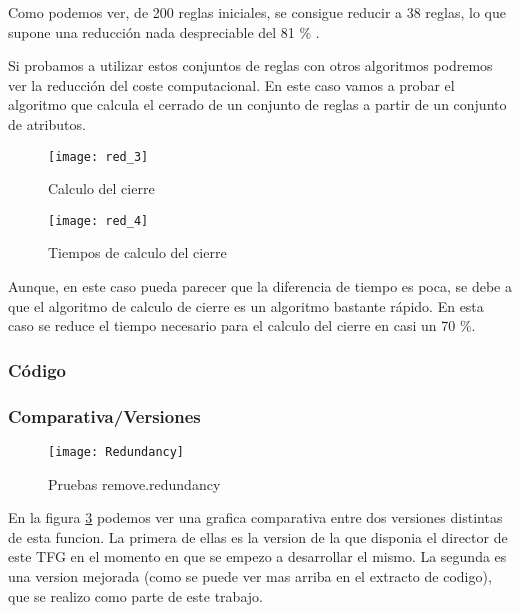 Como podemos ver, de 200 reglas iniciales, se consigue reducir a 38 reglas, lo que supone una reducci\'on nada despreciable del 81 \% .

Si probamos a utilizar estos conjuntos de reglas con otros algoritmos podremos ver la reducci\'on del coste computacional. En este caso vamos a probar el algoritmo que calcula el cerrado de un conjunto de reglas a partir de un conjunto de atributos.

\begin{figure}[H]
    \centering
    \texttt{[image: red\_3]}
    \caption{Calculo del cierre}
    \label{fig:red_3}
\end{figure}

\begin{figure}[H]
    \centering
    \texttt{[image: red\_4]}
    \caption{Tiempos de calculo del cierre}
    \label{fig:red_4}
\end{figure}

Aunque, en este caso pueda parecer que la diferencia de tiempo es poca, se debe a que el algoritmo de calculo de cierre es un algoritmo bastante r\'apido. En esta caso se reduce el tiempo necesario para el calculo del cierre en casi un 70 \%.

\newpage
\subsubsection{C\'odigo} 

\newpage
 
\subsubsection{Comparativa/Versiones} 
\begin{figure}[h]
    \centering
    \texttt{[image: Redundancy]}
    \caption{Pruebas remove.redundancy}
    \label{fig:redundancy}
\end{figure} 

En la figura \ref{fig:redundancy} podemos ver una grafica comparativa entre dos versiones distintas de esta funcion. La primera de ellas es la version de la que disponia el director de este TFG en el momento en que se empezo a desarrollar el mismo. La segunda es una version mejorada (como se puede ver mas arriba en el extracto de codigo), que se realizo como parte de este trabajo.